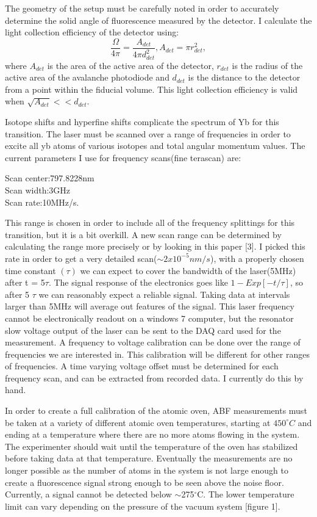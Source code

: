 \documentclass[12pt, a4paper]{article}
\begin{document}
The geometry of the setup must be carefully noted in order to accurately determine the solid angle of fluorescence measured by the detector. I calculate the light collection efficiency of the detector using:
\begin{equation}
\frac{\Omega}{4\pi} = \frac{A_{det}}{4\pi d_{det}^2},
A_{det} = \pi r_{det}^2,
\end{equation}
where $A_{det}$ is the area of the active area of the detector, $r_{det}$ is the radius of the active area of the avalanche photodiode and $d_{det}$ is the distance to the detector from a point within the fiducial volume. This light collection efficiency is valid when $\sqrt{A_{det}} << d_{det}$.

Isotope shifts and hyperfine shifts complicate the spectrum of Yb for this transition. The laser must be scanned over a range of frequencies in order to excite all yb atoms of various isotopes and total angular momentum values. The current parameters I use for frequency scans(fine terascan) are:
\begin{center}
Scan center:797.8228nm\\
Scan width:3GHz\\
Scan rate:10MHz/s.\\
\end{center}
This range is chosen in order to include all of the frequency splittings for this transition, but it is a bit overkill.  A new scan range can be determined by calculating the range more precisely or by looking in this paper [3]. I picked this rate in order to get a very detailed scan($\sim 2x10^{-5}nm/s$), with a properly chosen time constant $(\tau)$ we can expect to cover the bandwidth of the laser(5MHz) after t = 5$\tau$. The signal response of the electronics goes like $1-Exp[-t/\tau]$, so after 5 $\tau$ we can reasonably expect a reliable signal. Taking data at intervals larger than 5MHz will average out features of the signal. This laser frequency cannot be electronically readout on a windows 7 computer, but the resonator slow voltage output of the laser can be sent to the DAQ card used for the measurement. A frequency to voltage calibration can be done over the range of frequencies we are interested in. This calibration will be different for other ranges of frequencies. A time varying voltage offset must be determined for each frequency scan, and can be extracted from recorded data. I currently do this by hand.

In order to create a full calibration of the atomic oven, ABF measurements must be taken at a variety of different atomic oven temperatures, starting at $450^{\circ}C$ and ending at a temperature where there are no more atoms flowing in the system. The experimenter should wait until the temperature of the oven has stabilized before taking data at that temperature. Eventually the measurements are no longer possible as the number of atoms in the system is not large enough to create a fluorescence signal strong enough to be seen above the noise floor. Currently, a signal cannot be detected below $\sim$275$^{\circ}$C. The lower temperature limit can vary depending on the pressure of the vacuum system [figure 1].
\end{document}

